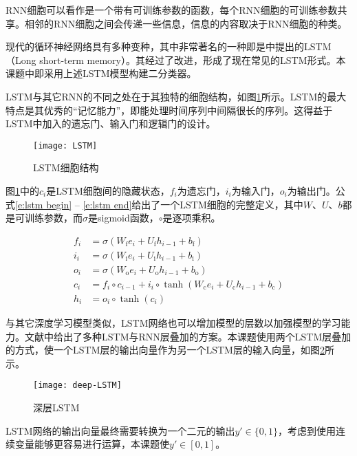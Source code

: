 RNN细胞可以看作是一个带有可训练参数的函数，每个RNN细胞的可训练参数共享。相邻的RNN细胞之间会传递一些信息，信息的内容取决于RNN细胞的种类。

现代的循环神经网络具有多种变种，其中非常著名的一种即是\cite{Hochreiter1997}中提出的LSTM（Long short-term memory）。其经过了\cite{Gers2000}改进，形成了现在常见的LSTM形式。本课题中即采用上述LSTM模型构建二分类器。

LSTM与其它RNN的不同之处在于其独特的细胞结构，如图\ref{f:lstm}所示。LSTM的最大特点是其优秀的“记忆能力”，即能处理时间序列中间隔很长的序列。这得益于LSTM中加入的遗忘门、输入门和逻辑门的设计。

\begin{figure}[htbp]
	\centering
	\texttt{[image: LSTM]}
	\caption{LSTM细胞结构}
	\label{f:lstm}
	\vspace{-1em}
\end{figure}

图\ref{f:lstm}中的$c_i$是LSTM细胞间的隐藏状态，$f_i$为遗忘门，$i_i$为输入门，$o_i$为输出门。公式\ref{e:lstm begin} -- \ref{e:lstm end}给出了一个LSTM细胞的完整定义，其中$W$、$U$、$b$都是可训练参数，而$\sigma$是sigmoid函数，$\circ$是逐项乘积。

\begin{align}
f_i &= \sigma(W_\text{f} e_i + U_\text{f} h_{i - 1} + b_\text{f}) \label{e:lstm begin} \\
i_i &= \sigma(W_\text{i} e_i + U_\text{i} h_{i - 1} + b_\text{i}) \\
o_i &= \sigma(W_\text{o} e_i + U_\text{o} h_{i - 1} + b_\text{o}) \\
c_i &= f_i \circ c_{i - 1} + i_i \circ \tanh(W_\text{c} e_i + U_\text{c} h_{i - 1} + b_\text{c}) \\
h_i &= o_i \circ \tanh(c_i) \label{e:lstm end}
\end{align}

与其它深度学习模型类似，LSTM网络也可以增加模型的层数以加强模型的学习能力。文献\cite{Sak2014}中给出了多种LSTM与RNN层叠加的方案。本课题使用两个LSTM层叠加的方式，使一个LSTM层的输出向量作为另一个LSTM层的输入向量，如图\ref{f:deep lstm}所示。

\begin{figure}[htbp]
	\centering
	\texttt{[image: deep-LSTM]}
	\caption{深层LSTM}
	\label{f:deep lstm}
	\vspace{-1em}
\end{figure}

LSTM网络的输出向量最终需要转换为一个二元的输出$y' \in \{0, 1\}$，考虑到使用连续变量能够更容易进行运算，本课题使$y' \in [0, 1]$。

